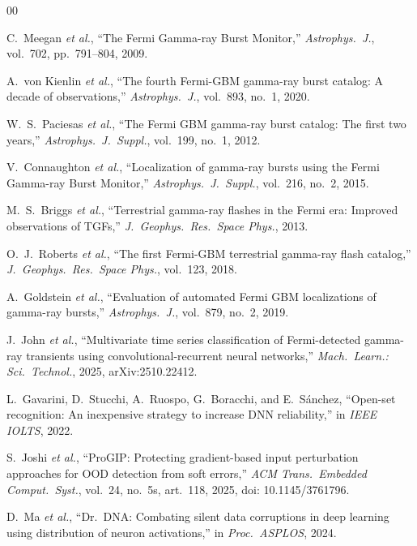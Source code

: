 \documentclass[journal]{IEEEtran}
\begin{document}
\begin{thebibliography}{00}

C.~Meegan \textit{et al.}, ``The Fermi Gamma-ray Burst Monitor,'' \textit{Astrophys.\ J.}, vol.~702, pp.~791--804, 2009.

A.~von Kienlin \textit{et al.}, ``The fourth Fermi-GBM gamma-ray burst catalog: A decade of observations,'' \textit{Astrophys.\ J.}, vol.~893, no.~1, 2020.

W.~S.~Paciesas \textit{et al.}, ``The Fermi GBM gamma-ray burst catalog: The first two years,'' \textit{Astrophys.\ J.\ Suppl.}, vol.~199, no.~1, 2012.

V.~Connaughton \textit{et al.}, ``Localization of gamma-ray bursts using the Fermi Gamma-ray Burst Monitor,'' \textit{Astrophys.\ J.\ Suppl.}, vol.~216, no.~2, 2015.

M.~S.~Briggs \textit{et al.}, ``Terrestrial gamma-ray flashes in the Fermi era: Improved observations of TGFs,'' \textit{J.\ Geophys.\ Res.\ Space Phys.}, 2013.

O.~J.~Roberts \textit{et al.}, ``The first Fermi-GBM terrestrial gamma-ray flash catalog,'' \textit{J.\ Geophys.\ Res.\ Space Phys.}, vol.~123, 2018.

A.~Goldstein \textit{et al.}, ``Evaluation of automated Fermi GBM localizations of gamma-ray bursts,'' \textit{Astrophys.\ J.}, vol.~879, no.~2, 2019.

J.~John \textit{et al.}, ``Multivariate time series classification of Fermi-detected gamma-ray transients using convolutional-recurrent neural networks,'' \textit{Mach.\ Learn.: Sci.\ Technol.}, 2025, arXiv:2510.22412.

L.~Gavarini, D.~Stucchi, A.~Ruospo, G.~Boracchi, and E.~S\'{a}nchez, ``Open-set recognition: An inexpensive strategy to increase DNN reliability,'' in \textit{IEEE IOLTS}, 2022.

S.~Joshi \textit{et al.}, ``ProGIP: Protecting gradient-based input perturbation approaches for OOD detection from soft errors,'' \textit{ACM Trans.\ Embedded Comput.\ Syst.}, vol.~24, no.~5s, art.~118, 2025, doi: 10.1145/3761796.

D.~Ma \textit{et al.}, ``Dr.\ DNA: Combating silent data corruptions in deep learning using distribution of neuron activations,'' in \textit{Proc.\ ASPLOS}, 2024.


\end{thebibliography}
\end{document}
